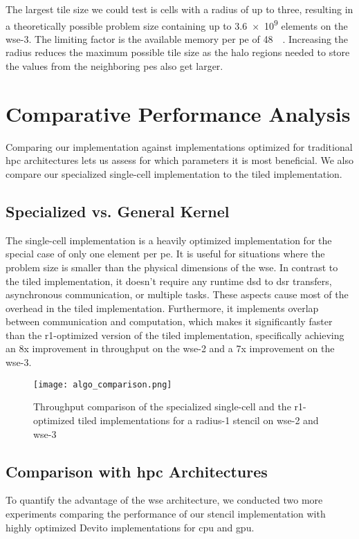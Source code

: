 The largest tile size we could test is  cells with a radius of up to three, resulting in a theoretically possible problem size containing up to \num{3.6e9} elements on the \ac{wse}-3. The limiting factor is the available memory per \ac{pe} of \qty{48}{\kilo\byte}. Increasing the radius reduces the maximum possible tile size as the halo regions needed to store the values from the neighboring \acp{pe} also get larger.

\section{Comparative Performance Analysis}
Comparing our implementation against implementations optimized for traditional \ac{hpc} architectures lets us assess for which parameters it is most beneficial. We also compare our specialized single-cell implementation to the tiled implementation.  

\subsection{Specialized vs. General Kernel}
The single-cell implementation is a heavily optimized implementation for the special case of only one element per \ac{pe}. It is useful for situations where the problem size is smaller than the physical dimensions of the \ac{wse}. In contrast to the tiled implementation, it doesn't require any runtime \ac{dsd} to \ac{dsr} transfers, asynchronous communication, or multiple tasks. These aspects cause most of the overhead in the tiled implementation. Furthermore, it implements overlap between communication and computation, which makes it significantly faster than the r1-optimized version of the tiled implementation, specifically achieving an 8x improvement in throughput on the \ac{wse}-2 and a 7x improvement on the \ac{wse}-3.
\begin{figure}[h]
    \centering
    \texttt{[image: algo\_comparison.png]}
    \caption{Throughput comparison of the specialized single-cell and the r1-optimized tiled implementations for a radius-1 stencil on \ac{wse}-2 and \ac{wse}-3}
    \label{fig:algo_comparison}
\end{figure}

\subsection{Comparison with \ac{hpc} Architectures}
To quantify the advantage of the \ac{wse} architecture, we conducted two more experiments comparing the performance of our stencil implementation with highly optimized Devito implementations for \ac{cpu} and \ac{gpu}. 

